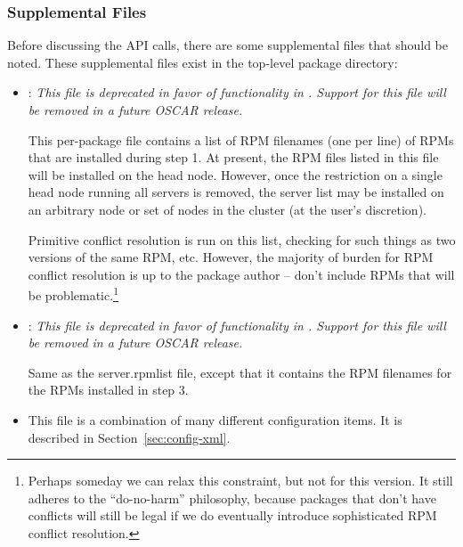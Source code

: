 
\subsubsection{Supplemental Files}

Before discussing the API calls, there are some supplemental files
that should be noted.  These supplemental files exist in the top-level
package directory:

\begin{itemize}

\begchange

\item {}: {\em This file is deprecated in favor of
    functionality in .  Support for this file will be
    removed in a future OSCAR release.}
  
  This per-package file contains a list of RPM filenames (one per
  line) of RPMs that are installed during step 1.  At present, the RPM
  files listed in this file will be installed on the head node.
  However, once the restriction on a single head node running all
  servers is removed, the server list may be installed on an arbitrary
  node or set of nodes in the cluster (at the user's discretion).
  
  Primitive conflict resolution is run on this list, checking for such
  things as two versions of the same RPM, etc.  However, the majority
  of burden for RPM conflict resolution is up to the package author --
  don't include RPMs that will be problematic.\footnote{ Perhaps
    someday we can relax this constraint, but not for this version.
    It still adheres to the ``do-no-harm'' philosophy, because
    packages that don't have conflicts will still be legal if we do
    eventually introduce sophisticated RPM conflict resolution.}
  
\item {}: {\em This file is deprecated in favor of
    functionality in .  Support for this file will be
    removed in a future OSCAR release.}
  
  Same as the server.rpmlist file, except that it contains the RPM
  filenames for the RPMs installed in step 3.
  
\item {} This file is a combination of many different
  configuration items.  It is described in
  Section~\ref{sec:config-xml}.

\end{itemize}

